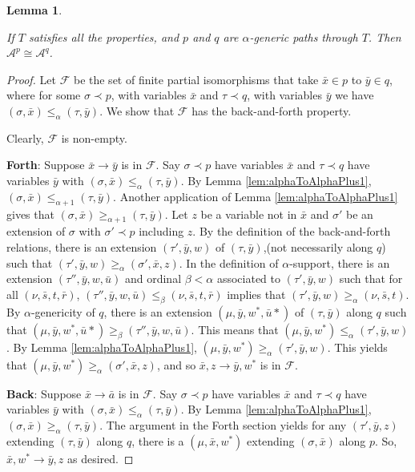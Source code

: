 \documentclass{article}
\newtheorem{lem}[thm]{Lemma}
\begin{document}
\begin{lem}
\label{lem25}

If $T$ satisfies all the properties, and $p$ and $q$ are $\alpha$-generic paths through $T$.  Then $\mathcal{A}^p\cong\mathcal{A}^q$.     

\end{lem}

\begin{proof}

Let $\mathcal{F}$ be the set of finite partial isomorphisms that take $\bar{x}\in p$ to $\bar{y}\in q$, where for some $\sigma\prec p$, with variables $\bar{x}$ and $\tau\prec q$, with variables $\bar{y}$ we have $(\sigma,\bar{x})\leq_\alpha(\tau,\bar{y})$.  We show that $\mathcal{F}$ has the back-and-forth property.

\bigskip

Clearly, $\mathcal{F}$ is non-empty.  

\bigskip
\noindent
\textbf{Forth}:  Suppose $\bar{x}\rightarrow\bar{y}$ is in $\mathcal{F}$.  Say $\sigma\prec p$ have variables $\bar{x}$ and $\tau\prec q$ have variables $\bar{y}$ with $(\sigma,\bar{x})\leq_\alpha(\tau,\bar{y})$. 
By Lemma \ref{lem:alphaToAlphaPlus1}, $(\sigma,\bar{x})\leq_{\alpha+1}(\tau,\bar{y})$.
Another application of Lemma \ref{lem:alphaToAlphaPlus1} gives that $(\sigma,\bar{x})\geq_{\alpha+1}(\tau,\bar{y})$.
 Let $z$ be a variable not in $\bar{x}$ and $\sigma'$ be an extension of $\sigma$ with $\sigma'\prec p$ including $z$.
 By the definition of the back-and-forth relations, there is an extension $(\tau',\bar{y},w)$ of $(\tau,\bar{y})$,(not necessarily along $q$) such that  $(\tau',\bar{y},w)\geq_\alpha(\sigma',\bar{x},z)$.
 In the definition of $\alpha$-support, there is an extension $(\tau'',\bar{y},w,\bar{u})$ and ordinal $\beta<\alpha$ associated to $(\tau',\bar{y},w)$ such that for all $(\nu,\bar{s},t,\bar{r})$, $(\tau'',\bar{y},w,\bar{u})\leq_\beta (\nu,\bar{s},t,\bar{r})$ implies that $(\tau',\bar{y},w)\geq_\alpha (\nu,\bar{s},t)$.
 By $\alpha$-genericity of $q$, there is an extension $(\mu,\bar{y},w^*,\bar{u}*)$ of $(\tau,\bar{y})$ along $q$ such that $(\mu,\bar{y},w^*,\bar{u}*)\geq_\beta(\tau'',\bar{y},w,\bar{u})$.
 This means that $(\mu,\bar{y},w^*)\leq_\alpha (\tau',\bar{y},w)$.
By Lemma \ref{lem:alphaToAlphaPlus1}, $(\mu,\bar{y},w^*)\geq_\alpha (\tau',\bar{y},w)$.
This yields that $(\mu,\bar{y},w^*)\geq_\alpha (\sigma',\bar{x},z)$, and so $\bar{x},z\rightarrow\bar{y},w^*$ is in $\mathcal{F}$. 
 

\bigskip
\noindent
\textbf{Back}:  Suppose $\bar{x}\rightarrow\bar{a}$ is in $\mathcal{F}$.
Say $\sigma\prec p$ have variables $\bar{x}$ and $\tau\prec q$ have variables $\bar{y}$ with $(\sigma,\bar{x})\leq_\alpha(\tau,\bar{y})$.
By Lemma \ref{lem:alphaToAlphaPlus1}, $(\sigma,\bar{x})\geq_{\alpha}(\tau,\bar{y})$.
The argument in the Forth section yields for any $(\tau',\bar{y},z)$ extending $(\tau,\bar{y})$ along $q$, there is a $(\mu,\bar{x},w^*)$ extending $(\sigma,\bar{x})$ along $p$.
So, $\bar{x},w^*\rightarrow\bar{y},z$ as desired.
\end{proof}
\end{document}
